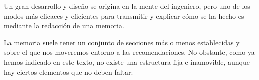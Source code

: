 

Un gran desarrollo y diseño se origina en la mente del ingeniero, pero uno de los modos más eficaces y eficientes para transmitir y explicar cómo se ha hecho es mediante la redacción de una memoria. 

La memoria suele tener un conjunto de secciones más o menos establecidas y sobre el que nos moveremos entorno a las recomendaciones. No obstante, como ya hemos indicado en este texto, no existe una estructura fija e inamovible, aunque hay ciertos elementos que no deben faltar:

